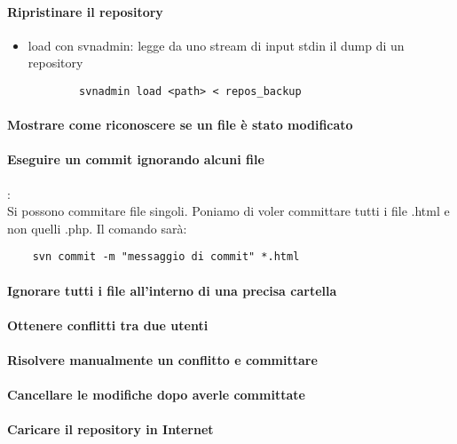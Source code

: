\documentclass[a4paper]{article}
\begin{document}
	\paragraph{Ripristinare il repository}
	\begin{itemize}
		\item load con svnadmin: legge da uno stream di input stdin il dump di un repository
		\begin{verbatim}
		svnadmin load <path> < repos_backup
		\end{verbatim}
	\end{itemize}
	\paragraph{Mostrare come riconoscere se un file è stato modificato}
	
	\paragraph{Eseguire un commit ignorando alcuni file}: \\
	Si possono commitare file singoli. Poniamo di voler committare tutti i file .html e non quelli .php. Il comando sarà:
	\begin{verbatim}
	svn commit -m "messaggio di commit" *.html
	\end{verbatim}
	\paragraph{Ignorare tutti i file all'interno di una precisa cartella}
	
	\paragraph{Ottenere conflitti tra due utenti}
	
	\paragraph{Risolvere manualmente un conflitto e committare}
	
	\paragraph{Cancellare le modifiche dopo averle committate}
	
	\paragraph{Caricare il repository in Internet}
	
\end{document}
